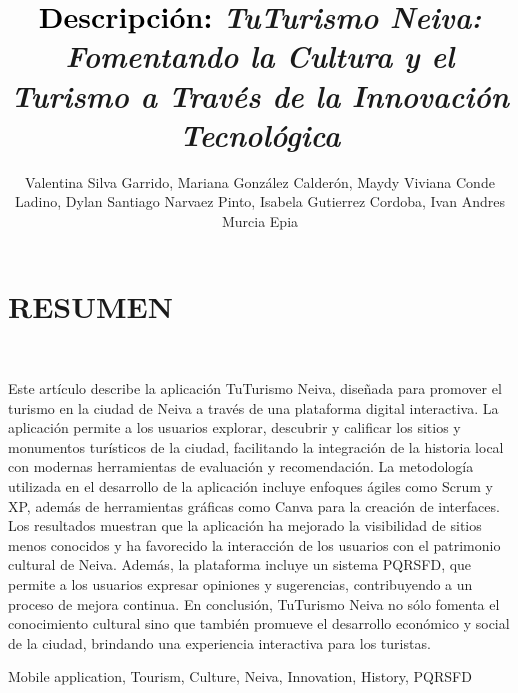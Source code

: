 \documentclass{IEEEoj-data}
\begin{document}

\title{\textcolor{black}{Descripción:} \textcolor{ieeedata}{\textit{TuTurismo Neiva: Fomentando la Cultura y el Turismo a Través de la Innovación Tecnológica}}}

\author{Valentina Silva Garrido, Mariana González Calderón, Maydy Viviana Conde Ladino, Dylan Santiago Narvaez Pinto, Isabela Gutierrez Cordoba, Ivan Andres Murcia Epia}



\maketitle

\section*{RESUMEN} 

Este artículo describe la aplicación TuTurismo Neiva, diseñada para promover el turismo en la ciudad de Neiva a través de una plataforma digital interactiva. La aplicación permite a los usuarios explorar, descubrir y calificar los sitios y monumentos turísticos de la ciudad, facilitando la integración de la historia local con modernas herramientas de evaluación y recomendación. La metodología utilizada en el desarrollo de la aplicación incluye enfoques ágiles como Scrum y XP, además de herramientas gráficas como Canva para la creación de interfaces. Los resultados muestran que la aplicación ha mejorado la visibilidad de sitios menos conocidos y ha favorecido la interacción de los usuarios con el patrimonio cultural de Neiva. Además, la plataforma incluye un sistema PQRSFD, que permite a los usuarios expresar opiniones y sugerencias, contribuyendo a un proceso de mejora continua. En conclusión, TuTurismo Neiva no sólo fomenta el conocimiento cultural sino que también promueve el desarrollo económico y social de la ciudad, brindando una experiencia interactiva para los turistas.

\begin{IEEEkeywords}
Mobile application, Tourism, Culture, Neiva, Innovation, History, PQRSFD
\end{IEEEkeywords}
\end{document}

